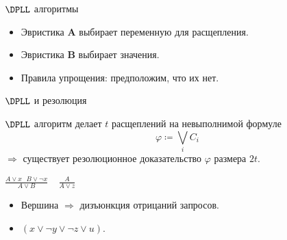 \begin{frame}{$\DPLL$ алгоритмы}

    \begin{center}
                
    \end{center}

    
	\pause
    \pause
    \pause
    \pause
    \pause
    \begin{itemize}
        \item Эвристика $\mathbf{A}$ выбирает переменную для расщепления.
    	\pause
	    \item Эвристика $\mathbf{B}$ выбирает значения.
    	\pause
    	\item Правила упрощения: \alert{предположим, что их нет}.
    \end{itemize}
\end{frame}

\begin{frame}{$\DPLL$ и резолюция}
    
    \begin{theorem}
        $\DPLL$ алгоритм делает $t$ расщеплений на невыполнимой формуле
        $$\varphi \coloneqq \bigvee\limits_i C_i$$
        $\Rightarrow$ существует резолюционное доказательство $\varphi$ размера $2t$.
    \end{theorem}

    \pause

    \begin{minipage}{0.58\linewidth}
        \centering
        
    \end{minipage}
    \pause
    \begin{minipage}{0.4\linewidth}
        \centering
        $\frac{A \lor x ~~~ B \lor \neg x}{A \lor B} ~~~~~ \frac{A}{A \lor z}$
        \begin{itemize}
            \item Вершина $\Rightarrow$ дизъюнкция отрицаний запросов.
            \item $(x \lor \neg y \lor \neg z \lor u)$.
        \end{itemize}
    \end{minipage}

\end{frame}


